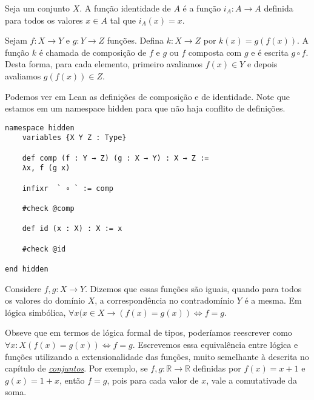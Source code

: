 \theoremstyle{definition}
\newtheorem{example}{Exemplo}[section]

\theoremstyle{plain}
\newtheorem{theorem}{Proposição}[section]

\theoremstyle{plain}
\newtheorem{corollary}{Corolário}[section]

\begin{definition}
    \label{def1}
    Seja um conjunto $X$. A função identidade de $A$ é a função 
    $i_A : A \rightarrow A$ definida para todos os valores $x \in A$ tal que $i_A(x) = x$.
\end{definition}

\begin{definition}
    \label{def2}
    Sejam $f : X \rightarrow Y$ e $g : Y \rightarrow Z$ funções. 
    Defina $k : X \rightarrow Z$ por $k(x) = g(f(x))$. A função $k$ é chamada de composição
    de $f$ e $g$ ou $f$ composta com $g$ e é escrita $g \circ f$. Desta forma, para cada elemento, 
    primeiro  avaliamos $f(x) \in Y$ e depois avaliamos $g(f(x)) \in Z$. 
\end{definition}

Podemos ver em Lean as definições de composição e de identidade. Note que estamos em um namespace 
hidden para que não haja conflito de definições. 

\begin{lstlisting}
namespace hidden
    variables {X Y Z : Type}

    def comp (f : Y → Z) (g : X → Y) : X → Z :=
    λx, f (g x)

    infixr  ` ∘ ` := comp

    #check @comp

    def id (x : X) : X := x

    #check @id
    
end hidden
\end{lstlisting}

\begin{definition}
    \label{def3}
    Considere $f,g : X \to Y$. Dizemos que essas funções são iguais, 
    quando para todos os valores do domínio $X$, a correspondência no contradomínio $Y$ é a 
    mesma. Em lógica simbólica, $\forall x (x \in X \to (f(x) = g(x)) \iff f = g $. 
\end{definition}

Obseve que em termos de lógica formal de tipos, poderíamos reescrever como 
$\forall x : X (f(x) = g(x)) \iff f = g$. Escrevemos essa equivalência entre lógica e funções 
utilizando a extensionalidade das funções, muito semelhante à descrita no capítulo de 
\textit{\hyperlink{chapter.5}{conjuntos}}. Por exemplo, se $f, g : \mathbb{R} \to \mathbb{R}$ 
definidas por $f(x) = x + 1$ e $g(x) = 1 + x$, então $f = g$, pois para cada valor de $x$, vale 
a comutativade da soma. 

